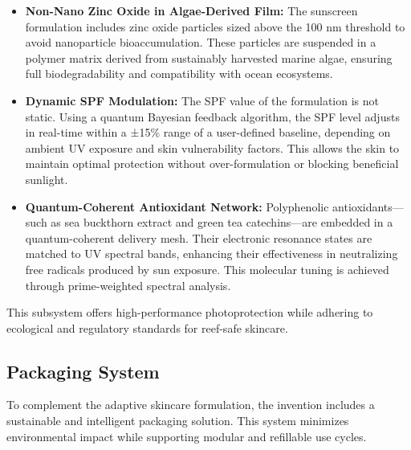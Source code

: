 \documentclass{article}
\theoremstyle{plain}
\theoremstyle{claimstyle}
\begin{document}
\begin{itemize}
    \item \textbf{Non-Nano Zinc Oxide in Algae-Derived Film:}  
    The sunscreen formulation includes zinc oxide particles sized above the 100 nm threshold to avoid nanoparticle bioaccumulation. These particles are suspended in a polymer matrix derived from sustainably harvested marine algae, ensuring full biodegradability and compatibility with ocean ecosystems.

    \item \textbf{Dynamic SPF Modulation:}  
    The SPF value of the formulation is not static. Using a quantum Bayesian feedback algorithm, the SPF level adjusts in real-time within a ±15\% range of a user-defined baseline, depending on ambient UV exposure and skin vulnerability factors. This allows the skin to maintain optimal protection without over-formulation or blocking beneficial sunlight.

    \item \textbf{Quantum-Coherent Antioxidant Network:}  
    Polyphenolic antioxidants—such as sea buckthorn extract and green tea catechins—are embedded in a quantum-coherent delivery mesh. Their electronic resonance states are matched to UV spectral bands, enhancing their effectiveness in neutralizing free radicals produced by sun exposure. This molecular tuning is achieved through prime-weighted spectral analysis.
\end{itemize}

This subsystem offers high-performance photoprotection while adhering to ecological and regulatory standards for reef-safe skincare.

\vspace{1em}

\subsection{Packaging System}

To complement the adaptive skincare formulation, the invention includes a sustainable and intelligent packaging solution. This system minimizes environmental impact while supporting modular and refillable use cycles.
\end{document}
